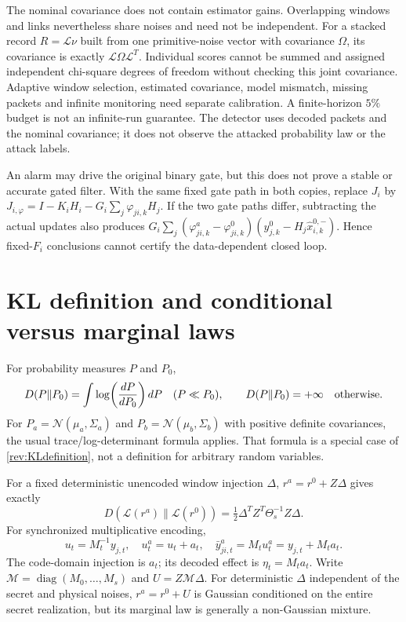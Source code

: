 \documentclass[11pt,a4paper]{article}
\begin{document}
The nominal covariance does not contain estimator gains. Overlapping
windows and links nevertheless share noises and need not be independent.
For a stacked record $R=\mathcal L\nu$ built from one primitive-noise
vector with covariance $\Omega$, its covariance is exactly
$\mathcal L\Omega\mathcal L^T$. Individual scores cannot be summed
and assigned independent chi-square degrees of freedom without checking
this joint covariance. Adaptive window selection, estimated covariance,
model mismatch, missing packets and infinite monitoring need separate
calibration. A finite-horizon $5\%$ budget is not an infinite-run guarantee.
The detector uses decoded packets and the nominal covariance; it does not
observe the attacked probability law or the attack labels.

An alarm may drive the original binary gate, but this does not prove a
stable or accurate gated filter. With the same fixed gate path in both
copies, replace $J_i$ by
$J_{i,\varphi}=I-K_iH_i-G_i\sum_j\varphi_{ji,k}H_j$.
If the two gate paths differ, subtracting the actual updates also produces
$G_i\sum_j(\varphi_{ji,k}^a-\varphi_{ji,k}^0)
(y_{j,k}^0-H_j\widehat x_{i,k}^{0,-})$.
Hence fixed-$F_i$ conclusions cannot certify the data-dependent closed loop.

\section{KL definition and conditional versus marginal laws}
\label{rev:KLsection}
For probability measures $P$ and $P_0$,
\begin{equation}
 D(P\|P_0)=\int\log\!\left(\frac{dP}{dP_0}\right)dP
 \quad(P\ll P_0),\qquad D(P\|P_0)=+\infty\quad\hbox{otherwise}.
 \label{rev:KLdefinition}
\end{equation}
For $P_a=\mathcal N(\mu_a,\Sigma_a)$ and
$P_b=\mathcal N(\mu_b,\Sigma_b)$ with positive definite covariances,
the usual trace/log-determinant formula applies. That formula is a
special case of \eqref{rev:KLdefinition}, not a definition for arbitrary
random variables.

For a fixed deterministic unencoded window injection $\Delta$,
$r^a=r^0+Z\Delta$ gives exactly
\begin{equation}
 D(\mathcal L(r^a)\|\mathcal L(r^0))
 =\tfrac12\Delta^TZ^T\Theta_s^{-1}Z\Delta.\label{rev:shiftKL}
\end{equation}
For synchronized multiplicative encoding,
\begin{equation}
 u_t=M_t^{-1}y_{j,t},\quad u_t^a=u_t+a_t,\quad
 \bar y_{ji,t}^a=M_tu_t^a=y_{j,t}+M_ta_t.\label{rev:encoding}
\end{equation}
The code-domain injection is $a_t$; its decoded effect is $\eta_t=M_ta_t$.
Write $\mathcal M=\operatorname{diag}(M_0,\ldots,M_s)$ and
$U=Z\mathcal M\Delta$. For deterministic $\Delta$ independent of
the secret and physical noises, $r^a=r^0+U$ is Gaussian conditioned
on the entire secret realization, but its marginal law is generally
a non-Gaussian mixture.
\end{document}
